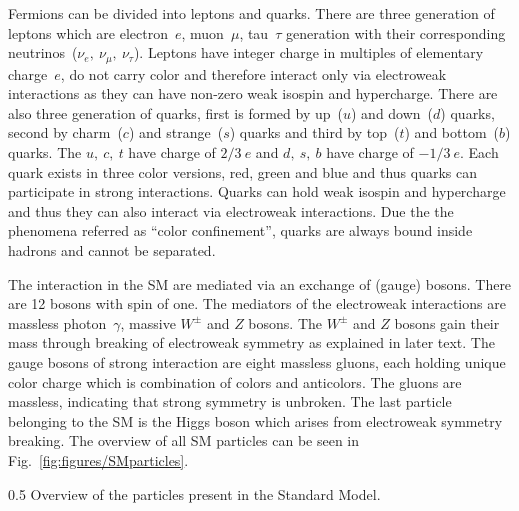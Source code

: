 Fermions can be divided into leptons and quarks. There are three generation of leptons which are electron~$e$, muon~$\mu$, tau~$\tau$ generation with their corresponding neutrinos~($\nu_{e},~\nu_{\mu},~\nu_{\tau}$). Leptons have integer charge in multiples of elementary charge~$e$, do not carry color and therefore interact only via electroweak interactions as they can have non-zero weak isospin and hypercharge. There are also three generation of quarks, first is formed by up~($u$) and down~($d$) quarks, second by charm~($c$) and strange~($s$) quarks and third by top~($t$) and bottom~($b$) quarks. The $u,~c,~t$ have charge of $2/3~e$ and $d,~s,~b$ have charge of $-1/3~e$. Each quark exists in three color versions, red, green and blue and thus quarks can participate in strong interactions. Quarks can hold weak isospin and hypercharge and thus they can also interact via electroweak interactions. Due the the phenomena referred as ``color confinement'', quarks are always bound inside hadrons and cannot be separated.

The interaction in the SM are mediated via an exchange of (gauge) bosons. There are 12 bosons with spin of one. The mediators of the electroweak interactions are massless photon~$\gamma$, massive $W^{\pm}$ and $Z$ bosons. The $W^{\pm}$ and $Z$ bosons gain their mass through breaking of electroweak symmetry as explained in later text. The gauge bosons of strong interaction are eight massless gluons, each holding unique color charge which is combination of colors and anticolors. The gluons are massless, indicating that strong symmetry is unbroken. The last particle belonging to the SM is the Higgs boson which arises from electroweak symmetry breaking. The overview of all SM particles can be seen in Fig.~\ref{fig:figures/SMparticles}.


                 {0.5}       %
                 { Overview of the particles present in the Standard Model.}



